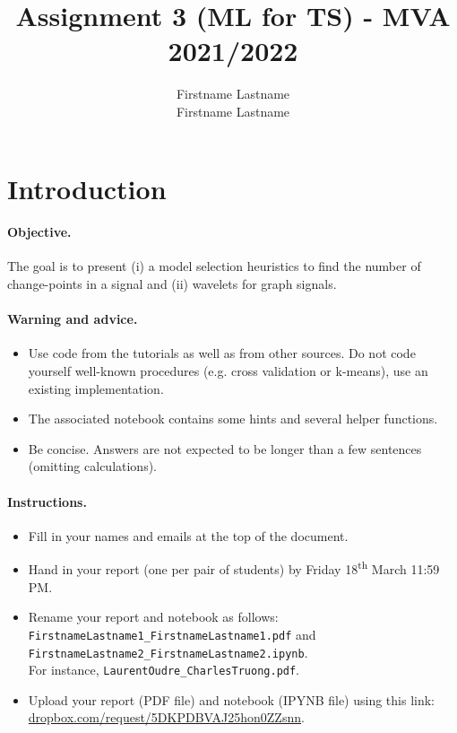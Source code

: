 \documentclass[11pt]{article}
\title{Assignment 3 (ML for TS) - MVA 2021/2022}
\author{
Firstname Lastname \email{youremail1@mail.com} \\ %
Firstname Lastname \email{youremail2@mail.com} %
}
\begin{document}
\maketitle

\section{Introduction}

\paragraph{Objective.} The goal is to present (i) a model selection heuristics to find the number of change-points in a signal and (ii) wavelets for graph signals.

\paragraph{Warning and advice.} 
\begin{itemize}
    \item Use code from the tutorials as well as from other sources. Do not code yourself well-known procedures (e.g. cross validation or k-means), use an existing implementation.
    \item The associated notebook contains some hints and several helper functions.
    \item Be concise. Answers are not expected to be longer than a few sentences (omitting calculations).
\end{itemize}



\paragraph{Instructions.}
\begin{itemize}
    \item Fill in your names and emails at the top of the document.
    \item Hand in your report (one per pair of students) by Friday 18\textsuperscript{th} March 11:59 PM.
    \item Rename your report and notebook as follows:\\ \texttt{FirstnameLastname1\_FirstnameLastname1.pdf} and\\ \texttt{FirstnameLastname2\_FirstnameLastname2.ipynb}.\\
    For instance, \texttt{LaurentOudre\_CharlesTruong.pdf}.
    \item Upload your report (PDF file) and notebook (IPYNB file) using this link: \href{https://www.dropbox.com/request/5DKPDBVAJ25hon0ZZsnn}{dropbox.com/request/5DKPDBVAJ25hon0ZZsnn}.
\end{itemize}
\end{document}

